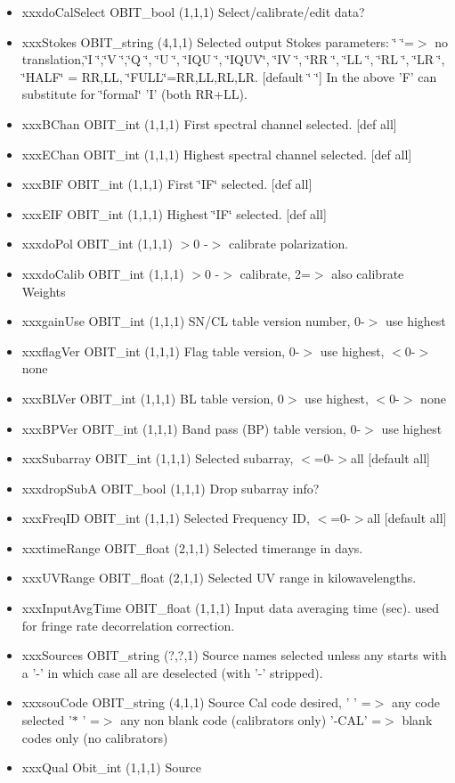 \begin{Desc}
\begin{description}
\begin{itemize}
\item xxxdo\-Cal\-Select OBIT\_\-bool (1,1,1) Select/calibrate/edit data? \item xxx\-Stokes OBIT\_\-string (4,1,1) Selected output Stokes parameters: \char`\"{}    \char`\"{}=$>$ no translation,\char`\"{}I   \char`\"{},\char`\"{}V   \char`\"{},\char`\"{}Q   \char`\"{}, \char`\"{}U   \char`\"{}, \char`\"{}IQU \char`\"{}, \char`\"{}IQUV\char`\"{}, \char`\"{}IV  \char`\"{}, \char`\"{}RR  \char`\"{}, \char`\"{}LL  \char`\"{}, \char`\"{}RL  \char`\"{}, \char`\"{}LR  \char`\"{}, \char`\"{}HALF\char`\"{} = RR,LL, \char`\"{}FULL\char`\"{}=RR,LL,RL,LR. [default \char`\"{}    \char`\"{}] In the above 'F' can substitute for \char`\"{}formal\char`\"{} 'I' (both RR+LL). \item xxx\-BChan OBIT\_\-int (1,1,1) First spectral channel selected. [def all] \item xxx\-EChan OBIT\_\-int (1,1,1) Highest spectral channel selected. [def all] \item xxx\-BIF OBIT\_\-int (1,1,1) First \char`\"{}IF\char`\"{} selected. [def all] \item xxx\-EIF OBIT\_\-int (1,1,1) Highest \char`\"{}IF\char`\"{} selected. [def all] \item xxxdo\-Pol OBIT\_\-int (1,1,1) $>$0 -$>$ calibrate polarization. \item xxxdo\-Calib OBIT\_\-int (1,1,1) $>$0 -$>$ calibrate, 2=$>$ also calibrate Weights \item xxxgain\-Use OBIT\_\-int (1,1,1) SN/CL table version number, 0-$>$ use highest \item xxxflag\-Ver OBIT\_\-int (1,1,1) Flag table version, 0-$>$ use highest, $<$0-$>$ none \item xxx\-BLVer OBIT\_\-int (1,1,1) BL table version, 0$>$ use highest, $<$0-$>$ none \item xxx\-BPVer OBIT\_\-int (1,1,1) Band pass (BP) table version, 0-$>$ use highest \item xxx\-Subarray OBIT\_\-int (1,1,1) Selected subarray, $<$=0-$>$all [default all] \item xxxdrop\-Sub\-A OBIT\_\-bool (1,1,1) Drop subarray info? \item xxx\-Freq\-ID OBIT\_\-int (1,1,1) Selected Frequency ID, $<$=0-$>$all [default all] \item xxxtime\-Range OBIT\_\-float (2,1,1) Selected timerange in days. \item xxx\-UVRange OBIT\_\-float (2,1,1) Selected UV range in kilowavelengths. \item xxx\-Input\-Avg\-Time OBIT\_\-float (1,1,1) Input data averaging time (sec). used for fringe rate decorrelation correction. \item xxx\-Sources OBIT\_\-string (?,?,1) Source names selected unless any starts with a '-' in which case all are deselected (with '-' stripped). \item xxxsou\-Code OBIT\_\-string (4,1,1) Source Cal code desired, ' ' =$>$ any code selected '$\ast$ ' =$>$ any non blank code (calibrators only) '-CAL' =$>$ blank codes only (no calibrators) \item xxx\-Qual Obit\_\-int (1,1,1) Source 
\end{itemize}
\end{description}
\end{Desc}
